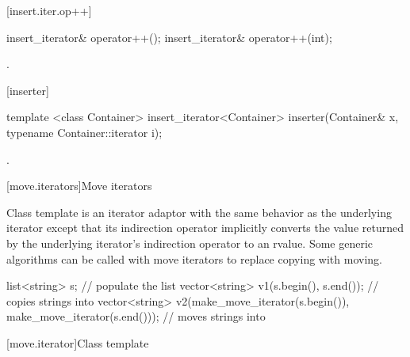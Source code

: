 [insert.iter.op++]{}

%
\begin{itemdecl}
insert_iterator& operator++();
insert_iterator& operator++(int);
\end{itemdecl}

\begin{itemdescr}
\pnum
\returns
{}.
\end{itemdescr}

[inserter]{}

%
\begin{itemdecl}
template <class Container>
  insert_iterator<Container> inserter(Container& x, typename Container::iterator i);
\end{itemdecl}

\begin{itemdescr}
\pnum
\returns
{}.
\end{itemdescr}

[move.iterators]{Move iterators}

\pnum
Class template  is an iterator adaptor
with the same behavior as the underlying iterator except that its
indirection operator implicitly converts the value returned by the
underlying iterator's indirection operator to an rvalue.
Some generic algorithms can be called with move iterators to replace
copying with moving.

\pnum
\begin{example}

\begin{codeblock}
list<string> s;
// populate the list 
vector<string> v1(s.begin(), s.end());          // copies strings into 
vector<string> v2(make_move_iterator(s.begin()),
                  make_move_iterator(s.end())); // moves strings into 
\end{codeblock}

\end{example}

[move.iterator]{Class template }

